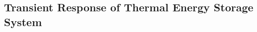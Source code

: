 \documentclass[10pt,compress]{beamer}
\begin{document}
\subsection{Transient Response of Thermal Energy Storage System}












%  
\end{document}
